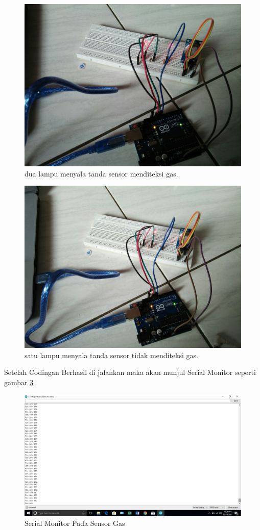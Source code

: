 \begin{figure}[ht]
	\centerline{\includegraphics[width=1\textwidth]{figures/terditeksi.jpg}}
	\caption{dua lampu menyala tanda sensor menditeksi gas.}
	\label{terditeksi}
	\end{figure}
\begin{figure}[ht]
	\centerline{\includegraphics[width=1\textwidth]{figures/tidakterditeksi.jpg}}
	\caption{satu lampu menyala tanda sensor tidak menditeksi gas.}
	\label{tidakterditeksi}
	\end{figure}
	
Setelah Codingan Berhasil di jalankan maka akan munjul Serial Monitor seperti gambar  \ref{SerialMonitor}
\begin{figure}[ht]
	\centerline{\includegraphics[width=1\textwidth]{figures/SerialMonitor.png}}
	\caption{Serial Monitor Pada Sensor Gas}
	\label{SerialMonitor}
	\end{figure}
